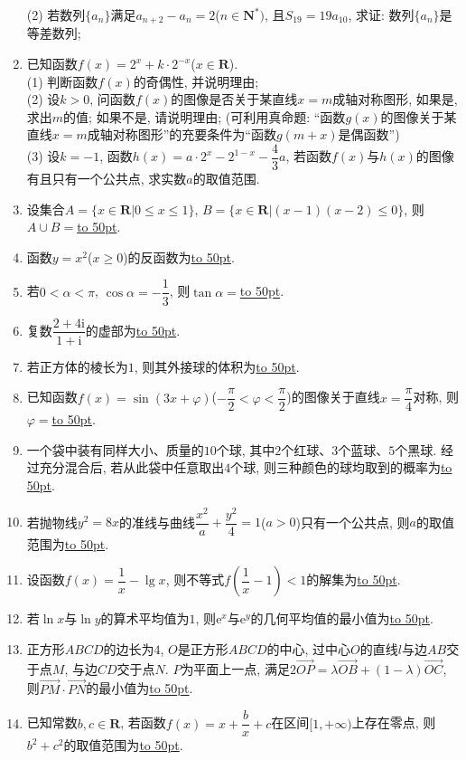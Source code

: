 \documentclass[10pt,a4paper]{article}
\newcommand{\blank}[1]{\underline{\hbox to #1pt{}}}
\begin{document}
\begin{enumerate}[1.]
(2) 若数列$\{a_n\}$满足$a_{n+2}-a_n=2$($n\in \mathbf{N}^*)$, 且$S_{19}=19a_{10}$, 求证: 数列$\{a_n\}$是等差数列;
\item 已知函数$f(x)=2^x+k\cdot 2^{-x}$($x\in \mathbf{R}$).\\
(1) 判断函数$f(x)$的奇偶性, 并说明理由;\\
(2) 设$k>0$, 问函数$f(x)$的图像是否关于某直线$x=m$成轴对称图形, 如果是, 求出$m$的值; 如果不是, 请说明理由; (可利用真命题: ``函数$g(x)$的图像关于某直线$x=m$成轴对称图形''的充要条件为``函数$g(m+x)$是偶函数'')\\
(3) 设$k=-1$, 函数$h(x)=a\cdot 2^x-2^{1-x}-\dfrac 43a$, 若函数$f(x)$与$h(x)$的图像有且只有一个公共点, 求实数$a$的取值范围.


\item 设集合$A=\{x\in\mathbf{R}|0\le x\le 1\}$, $B=\{x\in \mathbf{R}|(x-1)(x-2)\le 0\}$, 则$A\cup B=$\blank{50}.
\item 函数$y=x^2$($x\ge 0$)的反函数为\blank{50}.
\item 若$0<\alpha<\pi$, $\cos\alpha=-\dfrac 13$, 则$\tan\alpha=$\blank{50}.
\item 复数$\dfrac{2+4\mathrm{i}}{1+\mathrm{i}}$的虚部为\blank{50}.
\item 若正方体的棱长为$1$, 则其外接球的体积为\blank{50}.
\item 已知函数$f(x)=\sin(3x+\varphi)$($-\dfrac\pi 2<\varphi<\dfrac\pi 2$)的图像关于直线$x=\dfrac \pi 4$对称, 则$\varphi=$\blank{50}.
\item 一个袋中装有同样大小、质量的$10$个球, 其中$2$个红球、$3$个蓝球、$5$个黑球. 经过充分混合后, 若从此袋中任意取出$4$个球, 则三种颜色的球均取到的概率为\blank{50}.
\item 若抛物线$y^2=8x$的准线与曲线$\dfrac{x^2}a+\dfrac{y^2}4=1$($a>0$)只有一个公共点, 则$a$的取值范围为\blank{50}.
\item 设函数$f(x)=\dfrac 1x-\lg x$, 则不等式$f(\dfrac 1x-1)<1$的解集为\blank{50}.
\item 若$\ln x$与$\ln y$的算术平均值为$1$, 则$\mathrm{e}^x$与$\mathrm{e}^y$的几何平均值的最小值为\blank{50}.
\item 正方形$ABCD$的边长为$4$, $O$是正方形$ABCD$的中心, 过中心$O$的直线$l$与边$AB$交于点$M$, 与边$CD$交于点$N$. $P$为平面上一点, 满足$2
\overrightarrow{OP}=\lambda \overrightarrow{OB}+(1-\lambda)\overrightarrow{OC}$, 则$\overrightarrow{PM}\cdot \overrightarrow{PN}$的最小值为\blank{50}.
\item 已知常数$b,c\in \mathbf{R}$, 若函数$f(x)=x+\dfrac bx+c$在区间$[1,+\infty)$上存在零点, 则$b^2+c^2$的取值范围为\blank{50}.

\end{enumerate}
\end{document}
